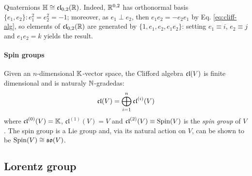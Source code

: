 \begin{example}{Quaternions}{}
  $ \mathbb{H} \cong \mathfrak{cl}_{0,2}(\mathbb{R}) $. Indeed, $ \mathbb{R}^{0,2} $ has orthonormal basis $ \{e_1,e_2\} : e_1^2 = e_2^2 = - \mathit{1} $; moreover, as $ e_1 \perp e_2 $, then $ e_1 e_2 = - e_2 e_1 $ by Eq. \ref{eq:cliff-alg}, so elements of $ \mathfrak{cl}_{0,2}(\mathbb{R}) $ are generated by $ \{\mathit{1},e_1,e_2,e_1 e_2\} $: setting $ e_1 \equiv i $, $ e_2 \equiv j $ and $ e_1 e_2 = k $ yields the result.
\end{example}

\paragraph{Spin groups}

Given an $ n $-dimensional $ \mathbb{K} $-vector space, the Clifford algebra $ \mathfrak{cl}(V) $ is finite dimensional and is naturaly $ \mathbb{N} $-graded\footnotemark as:
\begin{equation}
  \mathfrak{cl}(V) = \bigoplus_{i = 1}^n \mathfrak{cl}^{(i)}(V)
\end{equation}
where $ \mathfrak{cl}^{(0)}(V) = \mathbb{K} $, $ \mathfrak{cl}^{(1)}(V) = V $ and $ \mathfrak{cl}^{(2)}(V) \equiv \operatorname{Spin}(V) $ is the \textit{spin group} of $ V $. The spin group is a Lie group and, via its natural action on $ V $, can be shown to be $ \operatorname{Spin}(V) \cong \mathfrak{so}(V) $.


\subsection{Lorentz group}


